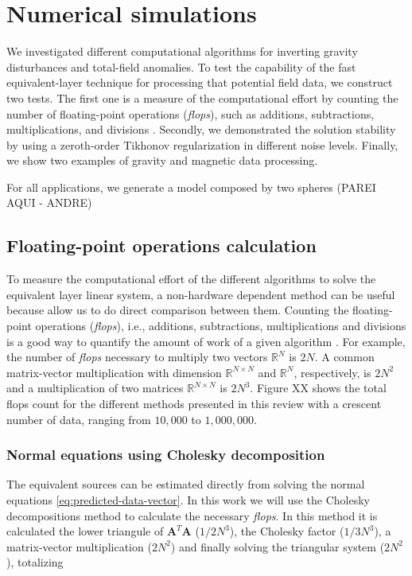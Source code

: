 \section{Numerical simulations}
\label{sec:num_simulations}

We investigated different computational algorithms for inverting gravity disturbances and total-field anomalies. To test the capability of the fast equivalent-layer technique for processing that potential field data, we construct two tests. The first one is a measure of the computational effort by counting the number of floating-point operations (\textit{flops}), such as additions, subtractions, multiplications, and divisions \citep{golub-vanloan2013}. Secondly, we demonstrated the solution stability by using a zeroth-order Tikhonov regularization in different noise levels. Finally, we show two examples of gravity and magnetic data processing.


For all applications, we generate a model composed by two spheres (PAREI AQUI - ANDRE)
%
\subsection{Floating-point operations calculation}

To measure the computational effort of the different algorithms to solve the equivalent layer linear system, a non-hardware dependent method can be useful because allow us to do direct comparison between them. Counting the floating-point operations (\textit{flops}), i.e., additions, subtractions, multiplications and divisions is a good way to quantify the amount of work of a given algorithm \citep{golub-vanloan2013}. For example, the number of \textit{flops} necessary to multiply two vectors $\mathbb{R}^{N}$ is $2N$. A common matrix-vector multiplication with dimension $\mathbb{R}^{N \times N}$ and $\mathbb{R}^{N}$, respectively, is $2N^2$ and a multiplication of two matrices $\mathbb{R}^{N \times N}$ is $2N^3$. Figure XX shows the total flops count for the different methods presented in this review with a crescent number of data, ranging from $10,000$ to $1,000,000$. 

\subsubsection{Normal equations using Cholesky decomposition}

The equivalent sources can be estimated directly from solving the normal equations \ref{eq:predicted-data-vector}. In this work we will use the Cholesky decompositions method to calculate the necessary \textit{flops}. In this method it is calculated the lower triangule of $\mathbf{A}^T\mathbf{A}$ ($1/2 N^3$), the Cholesky factor ($1/3 N^3$), a matrix-vector multiplication ($2N^2$) and finally solving the triangular system ($2N^2$), totalizing

